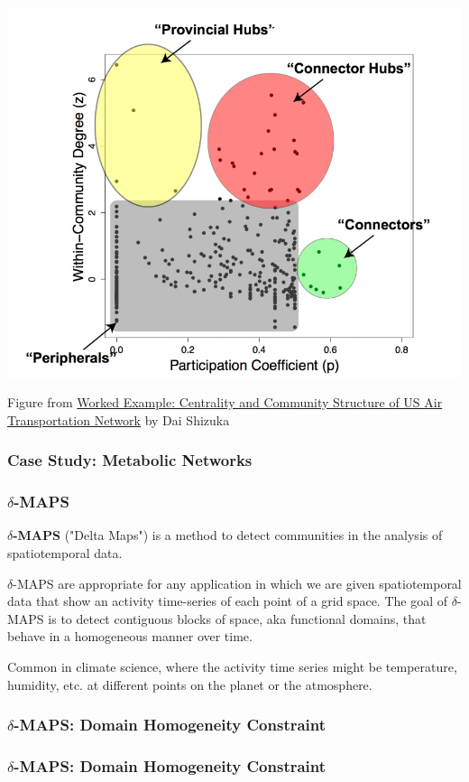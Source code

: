 \documentclass[11pt]{scrartcl} %
\begin{document}
\begin{center}
\includegraphics[width=0.75\linewidth]{img/L8.2-WithinModuleDegree.PNG}

{\tiny Figure from \href{https://dshizuka.github.io/networkanalysis/example_usairports.html}{Worked Example: Centrality and Community Structure of US Air Transportation Network} by Dai Shizuka}
\end{center}

\subsubsection{Case Study: Metabolic Networks}
\subsubsection{$\delta$-MAPS}
\textbf{$\delta$-MAPS} ("Delta Maps") is a method to detect communities in the analysis of spatiotemporal data. 

$\delta$-MAPS are appropriate for any application in which we are given spatiotemporal data that show an activity time-series of each point of a grid space. The goal of $\delta$-MAPS is to detect contiguous blocks of space, aka functional domains, that behave in a homogeneous manner over time. 

Common in climate science, where the activity time series might be temperature, humidity, etc. at different points on the planet or the atmosphere. 

\subsubsection{$\delta$-MAPS: Domain Homogeneity Constraint}
\subsubsection{$\delta$-MAPS: Domain Homogeneity Constraint}
\end{document}
